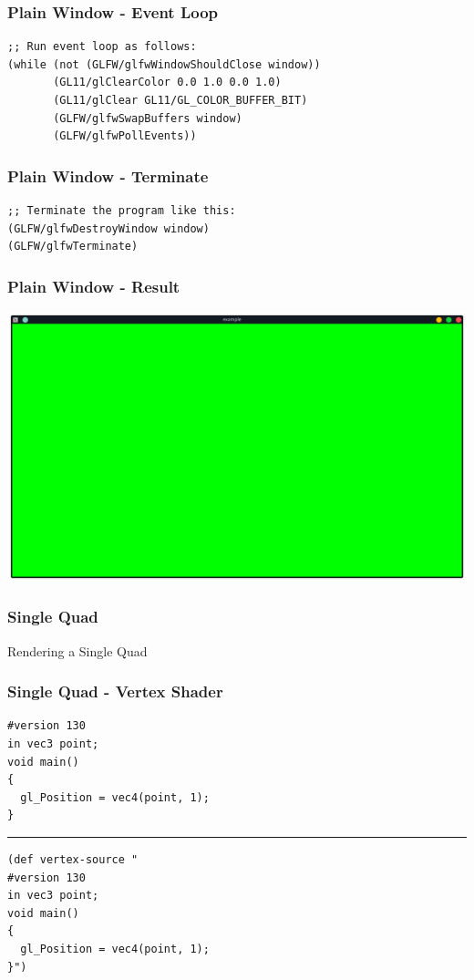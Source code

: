 \documentclass[aspectratio=169,11pt,xcolor=dvipsnames]{beamer}
\begin{document}
\begin{frame}[fragile]
  \frametitle{Plain Window {-} Event Loop}
  \begin{verbatim}
;; Run event loop as follows:
(while (not (GLFW/glfwWindowShouldClose window))
       (GL11/glClearColor 0.0 1.0 0.0 1.0)
       (GL11/glClear GL11/GL_COLOR_BUFFER_BIT)
       (GLFW/glfwSwapBuffers window)
       (GLFW/glfwPollEvents))
  \end{verbatim}
\end{frame}

\begin{frame}[fragile]
  \frametitle{Plain Window {-} Terminate}
  \begin{verbatim}
;; Terminate the program like this:
(GLFW/glfwDestroyWindow window)
(GLFW/glfwTerminate)
  \end{verbatim}
\end{frame}

\begin{frame}
  \frametitle{Plain Window {-} Result}
  \begin{center}
    \includegraphics[width=.8\textwidth]{window}
  \end{center}
\end{frame}

\begin{frame}
  \frametitle{Single Quad}
  \begin{center}
    \begin{huge}
      Rendering a Single Quad
    \end{huge}
  \end{center}
\end{frame}

\begin{frame}[fragile]
  \frametitle{Single Quad {-} Vertex Shader}
  \begin{verbatim}
#version 130
in vec3 point;
void main()
{
  gl_Position = vec4(point, 1);
}
  \end{verbatim}
  \rule{\textwidth}{1pt}
  \begin{verbatim}
(def vertex-source "
#version 130
in vec3 point;
void main()
{
  gl_Position = vec4(point, 1);
}")
  \end{verbatim}
\end{frame}
\end{document}

